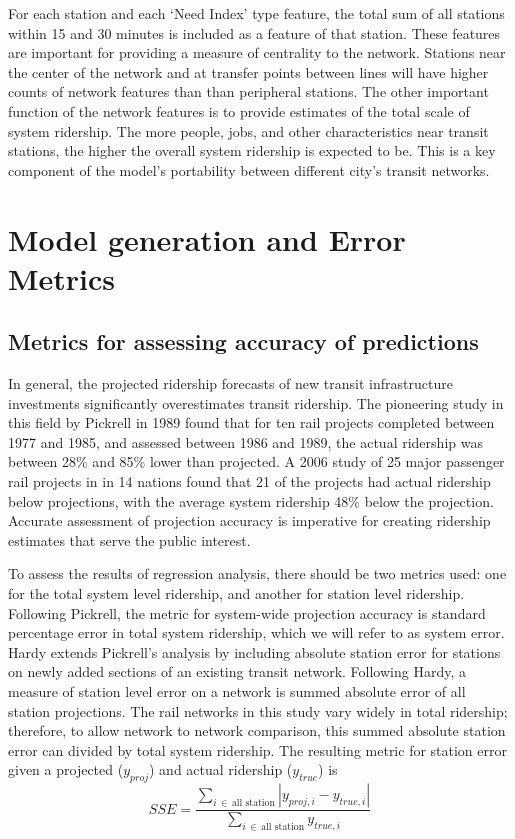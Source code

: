 \documentclass[11pt]{article}
\begin{document}
For each station and each `Need Index' type feature, the total sum of all stations within 15 and 30 minutes is included as a feature of that station. These features are important for providing a measure of centrality to the network. Stations near the center of the network and at transfer points between lines will have higher counts of network features than than peripheral stations. The other important function of the network features is to provide estimates of the total scale of system ridership. The more people, jobs, and other characteristics near transit stations, the higher the overall system ridership is expected to be. This is a key component of the model's portability between different city's transit networks. 

\section{Model generation and Error Metrics}

\subsection{Metrics for assessing accuracy of predictions}

In general, the projected ridership forecasts of new transit infrastructure investments significantly overestimates transit ridership. The pioneering study in this field by Pickrell in 1989 \cite{Pickrell1989} found that for ten rail projects completed between 1977 and 1985, and assessed between 1986 and 1989, the actual ridership was between 28\% and 85\% lower than projected. A 2006 study \cite{Flyvbjerg2006} of 25 major passenger rail projects in  in 14 nations found that 21 of the projects had actual ridership below projections, with the average system ridership 48\% below the projection. Accurate assessment of projection accuracy is imperative for creating ridership estimates that serve the public interest.

To assess the results of regression analysis, there should be two metrics used: one for the total system level ridership, and another for station level ridership. Following Pickrell, the metric for system-wide projection accuracy is standard percentage error in total system ridership, which we will refer to as system error. Hardy \cite{Hardy2010} extends Pickrell's analysis by including absolute station error for stations on newly added sections of an existing transit network. Following Hardy, a measure of station level error on a network is summed absolute error of all station projections. The rail networks in this study vary widely in total ridership; therefore, to allow network to network comparison, this summed absolute station error can divided by total system ridership. The resulting metric for station error given a projected ($y_{proj}$) and actual ridership ($y_{true}$) is 
$$SSE = \dfrac{\sum\limits_{i\,\in\,\text{all station}}\left|y_{proj, i} - y_{true, i}\right|}{\sum\limits_{i\,\in\,\text{all station}} y_{true, i}}$$
\end{document}

